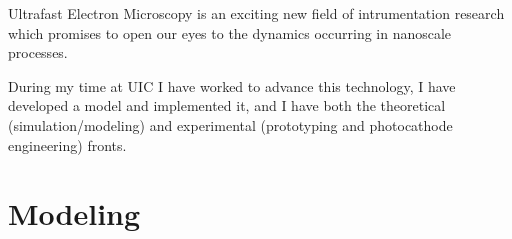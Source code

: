 
Ultrafast Electron Microscopy is an exciting new field of intrumentation research which promises to open our eyes to the dynamics occurring in nanoscale processes.

During my time at UIC I have worked to advance this technology, I have developed a model and implemented it, and I have  both the theoretical (simulation/modeling) and experimental (prototyping and photocathode engineering) fronts.

\section{Modeling}

